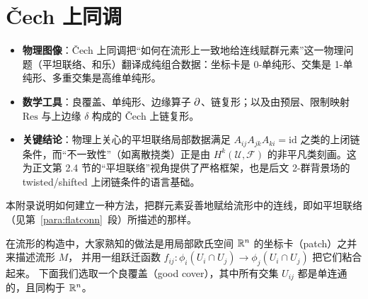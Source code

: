 
\section{Čech 上同调}

\begin{keytakeaways}
  \begin{itemize}[leftmargin=1.4em,itemsep=2pt,topsep=2pt]
    \item \textbf{物理图像}：Čech 上同调把“如何在流形上一致地给连线赋群元素”这一物理问题（平坦联络、和乐）翻译成纯组合数据：坐标卡是 0-单纯形、交集是 1-单纯形、多重交集是高维单纯形。
    \item \textbf{数学工具}：良覆盖、单纯形、边缘算子 $\partial$、链复形；以及由预层、限制映射 $\mathrm{Res}$ 与上边缘 $\delta$ 构成的 Čech 上链复形。
    \item \textbf{关键结论}：物理上关心的平坦联络局部数据满足 $A_{ij}A_{jk}A_{ki}=\mathrm{id}$ 之类的上闭链条件，而“不一致性”（如离散挠类）正是由 $H^k(\mathcal{U},\mathcal{F})$ 的非平凡类刻画。这为正文第 2.4 节的“平坦联络”视角提供了严格框架，也是后文 2-群背景场的 twisted/shifted 上闭链条件的语言基础。
  \end{itemize}
\end{keytakeaways}

\label{App:Cech}

本附录说明如何建立一种方法，把群元素妥善地赋给流形中的连线，即如平坦联络（见第~\ref{para:flatconn}~段）所描述的那样。

在流形的构造中，大家熟知的做法是用局部欧氏空间 ${\mathbb{R}}^n$ 的坐标卡（patch）之并来描述流形 $M$，
并用一组跃迁函数 $f_{ij} : \phi_i(U_i\cap U_j)\to \phi_j(U_i\cap U_j)$ 把它们粘合起来。
下面我们选取一个良覆盖（good cover），其中所有交集 $U_{ij}$ 都是单连通的，且同构于 ${\mathbb{R}}^n$。

